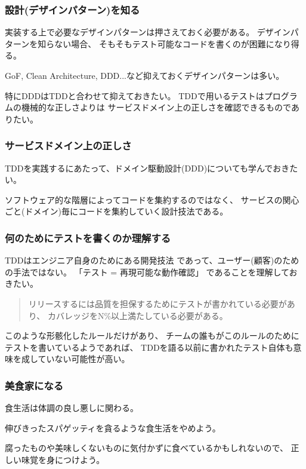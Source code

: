 \documentclass[aspectratio=169]{beamer}
\begin{document}
\begin{frame}\frametitle{設計(デザインパターン)を知る}
  {\color{blue} 実装する上で必要なデザインパターンは押さえておく必要がある。}
  {
    \color{gray}
    デザインパターンを知らない場合、
    そもそもテスト可能なコードを書くのが困難になり得る。
  }

  GoF, Clean Architecture, DDD...など抑えておくデザインパターンは多い。

  {\color{blue} 特にDDDはTDDと合わせて抑えておきたい。}
  {
    \color{gray}
    TDDで用いるテストはプログラムの機械的な正しさよりは
    サービスドメイン上の正しさを確認できるものでありたい。
  }
\end{frame}

\begin{frame}\frametitle{サービスドメイン上の正しさ}
  TDDを実践するにあたって、ドメイン駆動設計(DDD)についても学んでおきたい。

  ソフトウェア的な階層によってコードを集約するのではなく、
  サービスの関心ごと(ドメイン)毎にコードを集約していく設計技法である。

\end{frame}

\begin{frame}\frametitle{何のためにテストを書くのか理解する}
  {\color{blue} TDDはエンジニア自身のためにある開発技法}
  であって、ユーザー(顧客)のための手法ではない。
  {\color{blue} 「テスト = 再現可能な動作確認」}
  であることを理解しておきたい。
  \begin{quote}
    \color{gray}
    リリースするには品質を担保するためにテストが書かれている必要があり、
    カバレッジをN\%以上満たしている必要がある。
  \end{quote}
  このような形骸化したルールだけがあり、
  チームの誰もがこのルールのためにテストを書いているようであれば、
  TDDを語る以前に書かれたテスト自体も意味を成していない可能性が高い。
\end{frame}

\begin{frame}\frametitle{美食家になる}
  食生活は体調の良し悪しに関わる。

  伸びきったスパゲッティを貪るような食生活をやめよう。

  腐ったものや美味しくないものに気付かずに食べているかもしれないので、
  正しい味覚を身につけよう。
\end{frame}
\end{document}
